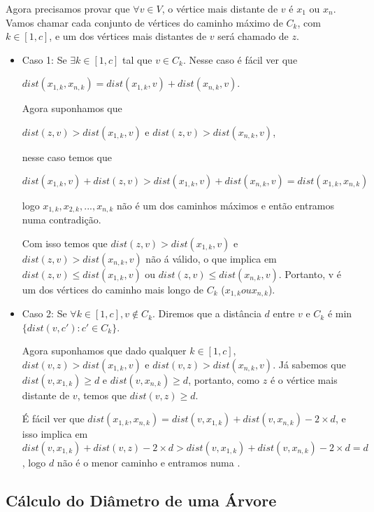 \documentclass[a4paper,12pt]{article}
\begin{document}
        Agora precisamos provar que $\forall v \in V$, o vértice mais distante
        de $v$ é $x_1$ ou $x_n$.
        Vamos chamar cada conjunto de vértices do caminho máximo de $C_k$, com $k \in [1, c]$,
        e um dos vértices mais distantes de $v$ será chamado de $z$.
        

        \begin{itemize}
            \item Caso 1: Se $\exists k \in [1, c]$ tal que $v \in C_k$.
            Nesse caso é fácil ver que 

            $dist(x_{1, k}, x_{n, k})=dist(x_{1, k}, v)+dist(x_{n, k}, v)$.

            Agora suponhamos que 

            $dist(z, v)>dist(x_{1, k}, v)$ e $dist(z, v)>dist(x_{n, k}, v)$,
            
            nesse caso temos que 
            
            $dist(x_{1, k}, v)+dist(z, v)>dist(x_{1, k}, v)+dist(x_{n, k}, v)=dist(x_{1, k}, x_{n, k})$
            
            logo $x_{1, k}, x_{2, k},..., x_{n, k}$ não é um dos caminhos máximos e então entramos numa contradição.

            Com isso temos que $dist(z, v)>dist(x_{1, k}, v)$ e $dist(z, v)>dist(x_{n, k}, v)$ não á válido,
            o que implica em $dist(z, v)\le dist(x_{1, k}, v)$ ou $dist(z, v)\le dist(x_{n, k}, v)$. Portanto,
            v é um dos vértices do caminho mais longo de $C_k$ ($x_{1, k} ou x_{n, k}$).

            \item Caso 2: Se $\forall k \in [1, c], v \notin C_k$. Diremos que a distância $d$ entre $v$ e $C_k$ é 
            min$\{dist(v, c'): c'\in C_k\}$.

            Agora suponhamos que dado qualquer $k \in [1, c]$,
            $dist(v, z)>dist(x_{1, k}, v)$ e $dist(v, z)>dist(x_{n, k}, v)$.
            Já sabemos que $dist(v, x_{1, k})\ge d$ e $dist(v, x_{n, k})\ge d$, portanto, como $z$ é o vértice mais
            distante de $v$, temos que
            $dist(v, z)\ge d$.

            É fácil ver que $dist(x_{1, k}, x_{n, k})=dist(v, x_{1, k})+dist(v, x_{n, k})-2\times d$, e isso implica em
            $dist(v, x_{1, k})+dist(v, z)-2\times d>dist(v, x_{1, k})+dist(v, x_{n, k})-2\times d=d$, logo $d$ não é o
            menor caminho e entramos numa .



        \end{itemize}
        
    \subsection{Cálculo do Diâmetro de uma Árvore}
    


\newpage
    
    
    
\end{document}
